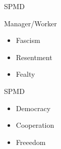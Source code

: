 \begin{frame}[fragile]
  \begin{block}{SPMD}
    \begin{center}
        \begin{minipage}{.47\textwidth}
        \begin{block}{Manager/Worker}
        \begin{itemize}
          \item Fascism
          \item Resentment
          \item Fealty
        \end{itemize}
        \end{block}
        \end{minipage}
        \hspace{.1cm}
        \begin{minipage}{.47\textwidth}
        \begin{block}{SPMD}
        \begin{itemize}
          \item Democracy
          \item Cooperation
          \item Freeedom
        \end{itemize}
        \end{block}
        \end{minipage}
    \end{center}
  \end{block}
\end{frame}



